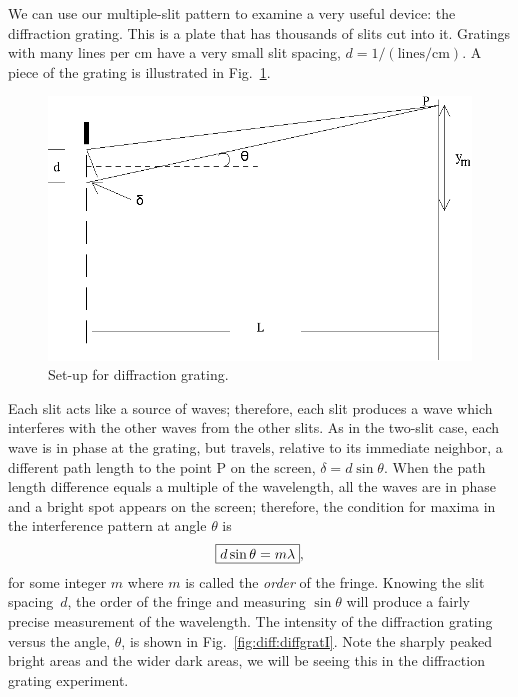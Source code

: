 We can use our multiple-slit pattern to examine a very useful device:
the diffraction grating. This is a plate that has thousands of slits cut into 
it.  Gratings with many lines per cm have a very small slit spacing, $d = 
1/(\mathrm{lines}/\mathrm{cm})$.  A piece of the grating is illustrated in 
Fig.~\ref{fig:diff:grating}.
\begin{figure}[htb]
\centering 
\epsfxsize=6cm \includegraphics{10_diffraction/grating.eps}
\caption{Set-up for diffraction grating.}
\label{fig:diff:grating}
\end{figure} 
Each slit acts like a source of waves; therefore, each slit produces a
wave which interferes with the other waves from the other slits.  As in the
two-slit case, each wave is in phase at the grating, but travels,
relative to its immediate neighbor, a different
path length to the point P on the screen, $\delta = d \sin \theta$.  
When the path length difference equals a multiple of the wavelength, all the waves
are in phase and a bright spot appears on the screen; therefore, the 
condition for maxima in the interference pattern at angle $\theta$ is 
\begin{eqnarray}
\fbox{$ \displaystyle d \sin \theta = m \lambda $},
\end{eqnarray}
for some integer $m$ where  
$m$ is called the {\em order} of the fringe. Knowing the slit spacing~$d$, the 
order of the fringe and measuring $\sin \theta$ will produce a fairly precise
measurement of the wavelength.  The intensity of the diffraction grating versus
the angle, $\theta$, is shown in Fig.~\ref{fig:diff:diffgratI}.  Note
the sharply peaked bright areas and the wider dark areas,  we will be seeing
this in the diffraction grating experiment.
